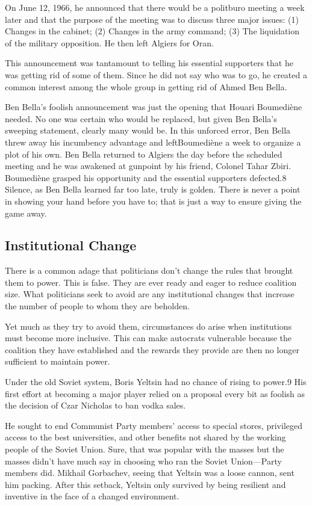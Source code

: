 \documentclass[10pt]{article}
\begin{document}
{\large On June 12, 1966, he announced that there would be a politburo meeting a
week later and that the purpose of the meeting was to discuss three major issues:
(1) Changes in the cabinet; (2) Changes in the army command; (3) The liquidation
of the military opposition. He then left Algiers for Oran.}

{\large This announcement was tantamount to telling his essential supporters
that he was getting rid of some of them. Since he did not say who was to go, he
created a common interest among the whole group in getting rid of Ahmed Ben
Bella.}

{\large Ben Bella's foolish announcement was just the opening that Houari
Boumedi\`{e}ne needed. No one was certain who would be replaced, but given Ben
Bella's sweeping statement, clearly many would be. In this unforced error, Ben
Bella threw away his incumbency advantage and leftBoumedi\`{e}ne a week to
organize a plot of his own. Ben Bella returned to Algiers the day before the
scheduled meeting and he was awakened at gunpoint by his friend, Colonel Tahar
Zbiri. Boumedi\`{e}ne grasped his opportunity and the essential supporters
defected.8 Silence, as Ben Bella learned far too late, truly is golden. There is
never a point in showing your hand before you have to; that is just a way to
ensure giving the game away.}

\subsection{Institutional Change}

{\large There is a common adage that politicians don't change the rules that
brought them to power. This is false. They are ever ready and eager to reduce
coalition size. What politicians seek to avoid are any institutional changes that
increase the number of people to whom they are beholden.}

{\large Yet much as they try to avoid them, circumstances do arise when
institutions must become more inclusive. This can make autocrats vulnerable
because the coalition they have established and the rewards they provide are then
no longer sufficient to maintain power.}

{\large Under the old Soviet system, Boris Yeltsin had no chance of rising to
power.9 His first effort at becoming a major player relied on a proposal every
bit as foolish as the decision of Czar Nicholas to ban vodka sales.}

{\large He sought to end Communist Party members' access to special stores,
privileged access to the best universities, and other benefits not shared by the
working people of the Soviet Union. Sure, that was popular with the masses but
the masses didn't have much say in choosing who ran the Soviet Union---Party
members did. Mikhail Gorbachev, seeing that Yeltsin was a loose cannon, sent him
packing. After this setback, Yeltsin only survived by being resilient and
inventive in the face of a changed environment.}
\end{document}
